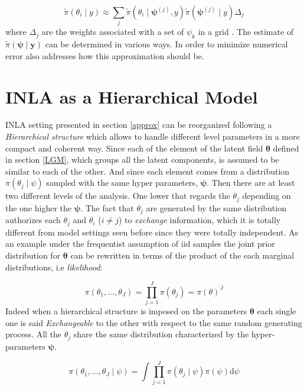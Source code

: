 \documentclass[
  12pt,
  a4paper,
  oneside]{book}
\theoremstyle{definition}
\theoremstyle{definition}
\theoremstyle{definition}
\theoremstyle{remark}
\begin{document}
\[
\tilde{\pi}\left(\theta_{i} \mid y\right) \approx \sum_{j} \tilde{\pi}\left(\theta_{i} \mid \boldsymbol{\psi}^{(j)}, y\right) \tilde{\pi}\left(\boldsymbol{\psi}^{(j)} \mid y\right) \Delta_{j}
\]
where \(\Delta_{j}\) are the weights associated with a set of \(\psi_{k}\) in a grid \citep{Krainski2018}. The estimate of \(\tilde\pi\left(\boldsymbol{\psi} \mid \boldsymbol{y}\right)\) can be determined in various ways. In order to minimize numerical error \citet{Rue2009} also addresses how this approximation should be.

\hypertarget{inlahier}{%
\section{INLA as a Hierarchical Model}\label{inlahier}}

INLA setting presented in section \ref{approx} can be reorganized following a \emph{Hierarchical structure} which allows to handle different level parameters in a more compact and coherent way.
Since each of the element of the latent field \(\boldsymbol{\theta}\) defined in section \ref{LGM}, which groups all the latent components, is assumed to be similar to each of the other. And since each element comes from a distribution \(\pi\left(\theta_{j} \mid \psi\right)\) sampled with the same hyper parameters, \(\boldsymbol \psi\). Then there are at least two different levels of the analysis. One lower that regards the \(\theta_j\) depending on the one higher the \(\boldsymbol\psi\).
The fact that \(\theta_j\) are generated by the same distribution authorizes each \(\theta_j\) and \(\theta_i\) (\(i \neq j\)) to \emph{exchange} information, which it is totally different from model settings seen before since they were totally independent. As an example under the frequentist assumption of iid samples the joint prior distribution for \(\boldsymbol\theta\) can be rewritten in terms of the product of the each marginal distributions, i.e \emph{likelihood}:

\[
\pi\left(\theta_{1}, \ldots, \theta_{J}\right)=\prod_{j=1}^{J} \pi\left(\theta_{j}\right)=\pi(\theta)^{J}
\]
Indeed when a hierarchical structure is imposed on the parameters \(\boldsymbol\theta\) each single one is said \emph{Exchangeable} to the other with respect to the same random generating process. All the \(\theta_j\) share the same distribution characterized by the hyper-parameters \(\boldsymbol\psi\).

\begin{equation}
  \pi\left(\theta_{1}, \ldots, \theta_{J} \mid \psi\right)=\int \prod_{j=1}^{J} \pi\left(\theta_{j} \mid \psi\right) \pi(\psi) \mathrm{d} \psi
\label{eq:exchange}
\end{equation}
\end{document}
